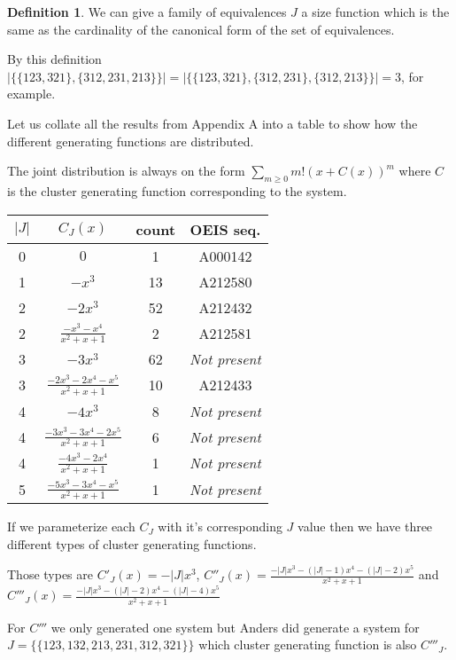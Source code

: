 \documentclass[openany, a4paper, 11pt, english]{article}
\theoremstyle{definition}
\newtheorem{definition}[theorem]{Definition}
\begin{document}
\begin{definition}
    We can give a family of equivalences $J$ a size function which is the same
    as the cardinality of the canonical form of the set of equivalences.

    By this definition $| \{ \{ 123, 321 \}, \{ 312, 231, 213 \} \}| = | \{ \{
    123, 321 \}, \{ 312, 231 \}, \{ 312, 213 \} \} | = 3$, for example.
\end{definition}

Let us collate all the results from Appendix A into a table to show how the
different generating functions are distributed.

The joint distribution is always on the form $\sum_{m \geq 0}m!(x+C(x))^m$ where $C$
is the cluster generating function corresponding to the system.

\begin{center}
\begin{tabular}{c|c|c|c}
    $|J|$ & $C_J(x)$ & count & OEIS seq. \\
    \hline
    0 & $0$ & 1 & A000142 \\
    1 & $-x^3$ & 13 & A212580 \\
    2 & $-2x^3$ & 52 & A212432 \\
    2 & $\frac{-x^3-x^4}{x^2+x+1}$ & 2 & A212581 \\
    3 & $-3x^3$ & 62 & \emph{Not present} \\
    3 & $\frac{-2x^3-2x^4-x^5}{x^2+x+1}$ & 10 & A212433 \\
    4 & $-4x^3$ & 8 & \emph{Not present} \\
    4 & $\frac{-3x^3-3x^4-2x^5}{x^2+x+1}$ & 6 & \emph{Not present}\\
    4 & $\frac{-4x^3-2x^4}{x^2+x+1}$ & 1 & \emph{Not present} \\ 
    \hline
    \hline
    5 & $\frac{-5x^3-3x^4-x^5}{x^2+x+1}$ & 1 & \emph{Not present} \\ 
\end{tabular}
\end{center}

If we parameterize each $C_J$ with it's corresponding $J$ value then we have
three different types of cluster generating functions.

Those types are $C'_J(x) = -|J|x^3$, $C''_J(x) = \frac{-|J|x^3-(|J|-1)x^4-(|J|-2)x^5}{x^2+x+1}$
and $C'''_J(x) = \frac{-|J|x^3-(|J|-2)x^4-(|J|-4)x^5}{x^2+x+1}$

For $C'''$ we only generated one system but Anders did generate a system for
$J = \{\{ 123, 132, 213, 231, 312, 321 \}\}$ which cluster generating function
is also $C'''_J$.
\end{document}
